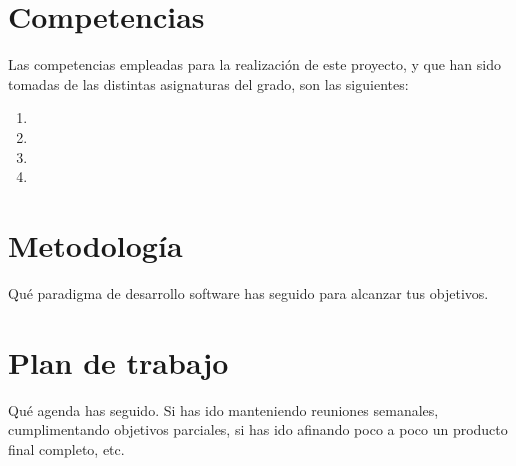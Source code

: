 \section{Competencias}
\label{sec:competencias}

Las competencias empleadas para la realización de este proyecto, y que han sido
tomadas de las distintas asignaturas del grado, son las siguientes:
\begin{enumerate}
  \item
  \item
  \item
  \item
\end{enumerate}  

\section{Metodología}
\label{sec:metodologia}




Qué paradigma de desarrollo software has seguido para alcanzar tus objetivos.

\section{Plan de trabajo}
\label{sec:plantrabajo}

Qué agenda has seguido. Si has ido manteniendo reuniones semanales, cumplimentando objetivos parciales, si has ido afinando poco a poco un producto final completo, etc.
